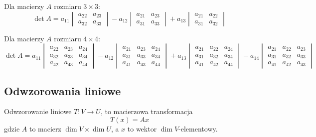 \documentclass{../notatki}
\begin{document}
\begin{examplebox}
  Dla macierzy $A$ rozmiaru $3 \times 3$:
  $$
  \det A = a_{11}
  \begin{vmatrix}
    a_{22} & a_{23} \\
    a_{32} & a_{33}
  \end{vmatrix} - a_{12}
  \begin{vmatrix}
    a_{21} & a_{23} \\
    a_{31} & a_{33}
  \end{vmatrix} + a_{13}
  \begin{vmatrix}
    a_{21} & a_{22} \\
    a_{31} & a_{32}
  \end{vmatrix}
  $$

  Dla macierzy $A$ rozmiaru $4 \times 4$:
  $$
  \det A = a_{11}
  \begin{vmatrix}
    a_{22} & a_{23} & a_{24} \\
    a_{32} & a_{33} & a_{34} \\
    a_{42} & a_{43} & a_{44}
  \end{vmatrix} - a_{12}
  \begin{vmatrix}
    a_{21} & a_{23} & a_{24} \\
    a_{31} & a_{33} & a_{34} \\
    a_{41} & a_{43} & a_{44}
  \end{vmatrix} + a_{13}
  \begin{vmatrix}
    a_{21} & a_{22} & a_{24} \\
    a_{31} & a_{32} & a_{34} \\
    a_{41} & a_{42} & a_{44}
  \end{vmatrix} - a_{14}
  \begin{vmatrix}
    a_{21} & a_{22} & a_{23} \\
    a_{31} & a_{32} & a_{33} \\
    a_{41} & a_{42} & a_{43}
  \end{vmatrix}
  $$

\end{examplebox}

\subsection{Odwzorowania liniowe}

Odwzorowanie liniowe $T: V \to U$, to
macierzowa transformacja
$$
T(x) = Ax
$$
gdzie $A$ to macierz $\dim V \times \dim U$, a $x$ to wektor $\dim
V$-elementowy.
\end{document}
